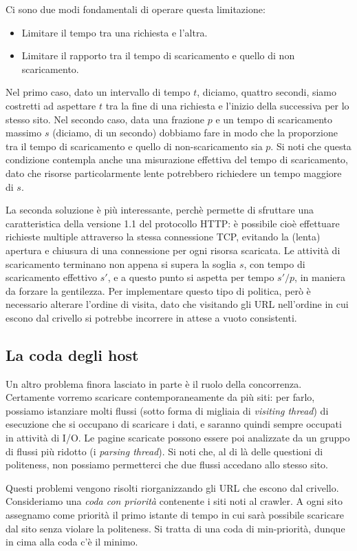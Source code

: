 Ci sono due modi fondamentali di operare questa limitazione:
\begin{itemize}
    \item Limitare il tempo tra una richiesta e l'altra.
    \item Limitare il rapporto tra il tempo di scaricamento e quello di non scaricamento.
\end{itemize}
Nel primo caso, dato un intervallo di tempo $t$, diciamo, quattro secondi, siamo costretti ad aspettare $t$ tra la fine di una richiesta e l'inizio della successiva per lo stesso sito. Nel secondo caso, data una frazione $p$ e un tempo di scaricamento massimo $s$ (diciamo, di un secondo) dobbiamo fare in modo che la proporzione tra il tempo di scaricamento e quello di non-scaricamento sia $p$. Si noti che questa condizione contempla anche una misurazione effettiva del tempo di scaricamento, dato che risorse particolarmente lente potrebbero richiedere un tempo maggiore di $s$.

La seconda soluzione è più interessante, perchè permette di sfruttare una caratteristica della versione 1.1 del protocollo HTTP: è possibile cioè effettuare richieste multiple attraverso la stessa connessione TCP, evitando la (lenta) apertura e chiusura di una connessione per ogni risorsa scaricata. Le attività di scaricamento terminano non appena si supera la soglia $s$, con tempo di scaricamento effettivo $s'$, e a questo punto si aspetta per tempo $s'/p$, in maniera da forzare la gentilezza.
Per implementare questo tipo di politica, però è necessario alterare l'ordine di visita, dato che visitando gli URL nell'ordine in cui escono dal crivello si potrebbe incorrere in attese a vuoto consistenti.
\subsection{La coda degli host}
Un altro problema finora lasciato in parte è il ruolo della concorrenza. Certamente vorremo scaricare contemporaneamente da più siti: per farlo, possiamo istanziare molti flussi (sotto forma di migliaia di \textit{visiting thread}) di esecuzione che si occupano di scaricare i dati, e saranno quindi sempre occupati in attività di I/O. Le pagine scaricate possono essere poi analizzate da un gruppo di flussi più ridotto (i \textit{parsing thread}). Si noti che, al di là delle questioni di politeness, non possiamo permetterci che due flussi accedano allo stesso sito.

Questi problemi vengono risolti riorganizzando gli URL che escono dal crivello. Consideriamo una \textit{coda con priorità} contenente i siti noti al crawler. A ogni sito assegnamo come priorità il primo istante di tempo in cui sarà possibile scaricare dal sito senza violare la politeness. Si tratta di una coda di min-priorità, dunque in cima alla coda c'è il minimo.

